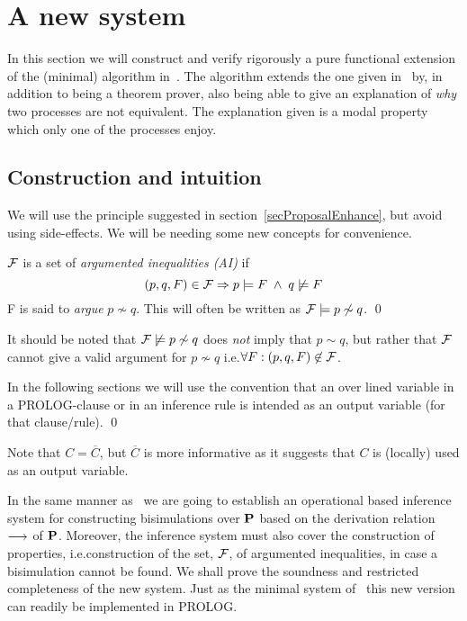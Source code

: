 
\chapter[A new system]{A new system}\label{chapAnew}

In this section we will construct and verify rigorously a pure functional extension of the (minimal) algorithm in~\cite{Larsen}. The algorithm extends the one given in~\cite{Larsen} by, in addition to being a theorem prover, also being able to give an explanation of {\em why\/} two processes are not equivalent. The explanation given is a modal property which only one of the processes enjoy.

\section{Construction and intuition}

We will use the principle suggested in section~\ref{secProposalEnhance}, but avoid using side-effects. We will be needing some new concepts for convenience.

\begin{definition}
${\cal F}$ is a set of {\em argumented inequalities (AI)\/} if
\[
(p,q,F)\in {\cal F}\Rightarrow p\models F\; \wedge\; q\not\models F
\]
{\cal F} is said to {\em argue\/} $p\not\sim q$. This will often be written as ${\cal F}\models p\not\sim q$.
\qed
\end{definition}
It should be noted that ${\cal F}\not\models p\not\sim q$ does {\em not\/} imply that $p\sim q$, but rather that $\cal F$ cannot give a valid argument for $p\not\sim q$ i.e.\@ $\forall F: (p,q,F)\not\in\cal F$.

\begin{notation}
In the following sections we will use the convention that an over lined variable in a PROLOG-clause or in an inference rule is intended as an output variable (for that clause/rule).
\qed
\end{notation}

Note that $C = \overline{C}$, but $\overline{C}$ is more informative as it suggests that $C$ is (locally) used as an output variable.

In the same manner as~\cite{Larsen} we are going to establish an operational based inference system for constructing bisimulations over $\bf P$ based on the derivation relation $\stackrel{}{\longrightarrow}$ of $\bf P$. Moreover, the inference system must also cover the construction of properties, i.e.\@ construction of the set, $\cal F$, of argumented inequalities, in case a bisimulation cannot be found. We shall prove the soundness and restricted completeness of the new system. Just as the minimal system of~\cite{Larsen} this new version can readily be implemented in PROLOG.

